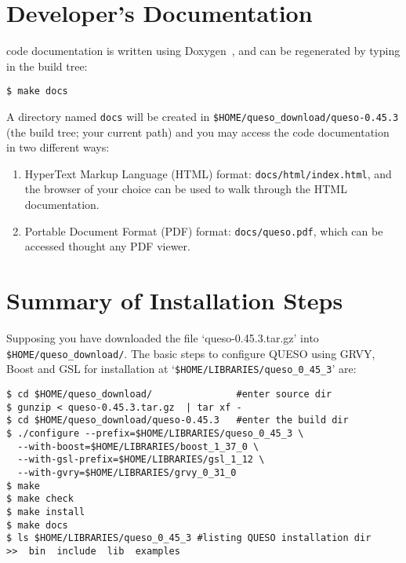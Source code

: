 \section{\Queso{} Developer's Documentation}\label{sec:Queso_docs}



\Queso{} code documentation is written using Doxygen~\cite{Doxygen}, and can be regenerated by typing in the build tree:
\begin{lstlisting}
$ make docs
\end{lstlisting}

A directory named \verb+docs+ will be created in \verb+$HOME/queso_download/queso-0.45.3+ (the build tree; your current path) and you may access the code documentation in two different ways:
\begin{enumerate}
 \item HyperText Markup Language (HTML)  format: \verb+docs/html/index.html+, and the browser of your choice can be used to walk through the HTML documentation.

\item Portable Document Format (PDF) format: \verb+docs/queso.pdf+, which can be accessed thought any PDF viewer.
\end{enumerate}
% 

\section{Summary of Installation Steps}\label{sec:summary}


Supposing you have downloaded the file `queso-0.45.3.tar.gz' into \texttt{\$HOME/queso\_download/}.
%
The basic steps to configure QUESO using GRVY, Boost and GSL for installation at \linebreak 
`\verb+$HOME/LIBRARIES/queso_0_45_3+'  are:

\begin{lstlisting}
$ cd $HOME/queso_download/               #enter source dir
$ gunzip < queso-0.45.3.tar.gz  | tar xf -
$ cd $HOME/queso_download/queso-0.45.3   #enter the build dir
$ ./configure --prefix=$HOME/LIBRARIES/queso_0_45_3 \
  --with-boost=$HOME/LIBRARIES/boost_1_37_0 \
  --with-gsl-prefix=$HOME/LIBRARIES/gsl_1_12 \
  --with-gvry=$HOME/LIBRARIES/grvy_0_31_0 
$ make 
$ make check
$ make install 
$ make docs
$ ls $HOME/LIBRARIES/queso_0_45_3 #listing QUESO installation dir
>>  bin  include  lib  examples
\end{lstlisting}

